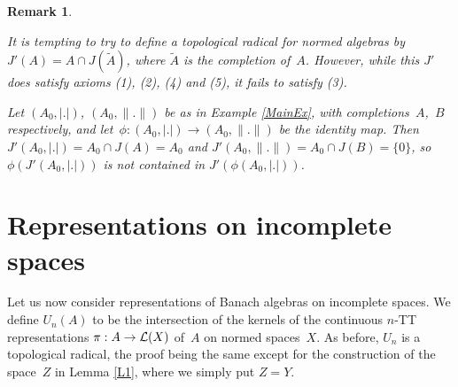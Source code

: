 \documentclass[11pt]{article}
\newenvironment{Proof}{{\it Proof. }}{}%
\newtheorem{remk}[thm]{Remark}
\newenvironment{Remark}{\begin{remk}\begin{rm}}{\end{rm}\end{remk}}
\newcommand{\Detail}[1]{}
\newcommand{\nn}[1]{|#1|}
\newcommand{\LX}{{\cal L}(X)}
\begin{document}
\begin{Remark}
It is tempting to try to define a topological radical for normed algebras by
$J'(A) = A \cap J(\tilde A)$, where $\tilde A$ is the completion of~$A$.
However, while this $J'$ does satisfy axioms (1), (2), (4) and (5), it fails to
satisfy (3).
\Detail{If~$R$ is a hereditary topological radical for Banach algebras, then $R'$ is a
hereditary topological radical for normed algebras, except insofar as it might fail to
satisfy (3).

\begin{Proof}
Since~$R$ is a hereditary topological radical, $R(\tilde A)$ is a closed ideal of $\tilde A$.
Hence $R'(A)$ is a closed ideal of~$A$.  We check the axioms (2), (4) and (5).
Axiom (1) follows from (5).

{\bf (2)}~~Using the fact that $(A/I)\:\tilde{}\: = \tilde A/\tilde I$ we see that
$$R'(A/R'(A)) = A/R'(A) \cap R((A/R'(A))\:\tilde{}\:)
            = A/R'(A) \cap R(\tilde A/R(\tilde A)) = \{0\}.$$

{\bf (4), (5)}~~If~$I$ is a closed ideal of~$A$, then $\tilde I$ is a closed
ideal of $\tilde A$, so $R(\tilde I)$ is a closed ideal of $\tilde A$ and
$R(\tilde I) = R(\tilde A) \cap \tilde I$.   Therefore
$R'(I) = I \cap R(\tilde I)$ is a closed ideal of~$A$ and
$$R'(I) = A \cap R(\tilde A) \cap \tilde I
        = (A \cap R(\tilde A)) \cap (A \cap\tilde I)
        = R'(A) \cap I.$$
\end{Proof}}

Let $(A_0,\nn{.})$, $(A_0,\|.\|)$ be as in Example \ref{MainEx}, with
completions~$A$,~$B$ respectively, and let~$\phi:(A_0,\nn{.})\to(A_0,\|.\|)$
be the identity map.   Then $J'(A_0,\nn{.}) = A_0 \cap J(A) = A_0$ and
$J'(A_0,\|.\|) = A_0 \cap J(B) = \{0\}$, so $\phi(J'(A_0,\nn{.}))$ is not
contained in $J'(\phi(A_0,\nn{.}))$.
\end{Remark}

\section{Representations on incomplete spaces}\label{S9}

Let us now consider representations of Banach algebras on incomplete spaces.
We define $U_n(A)$ to be the intersection of the kernels of the continuous $n$-TT
representations $\pi:A\to \LX$ of~$A$ on normed spaces~$X$.   As before, $U_n$
is a topological radical, the proof being the same except for the construction
of the space~$Z$ in Lemma \ref{L1}, where we simply put $Z=Y$.
\end{document}
